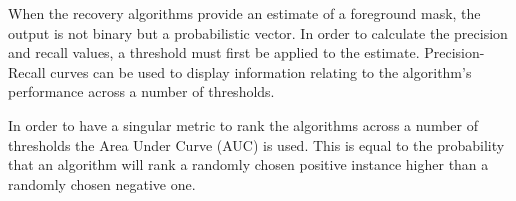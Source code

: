 When the recovery algorithms provide an estimate of a foreground mask, the output is not binary but a probabilistic vector. In order to calculate the precision and recall values, a threshold must first be applied to the estimate. Precision-Recall curves can be used to display information relating to the algorithm's performance across a number of thresholds.

In order to have a singular metric to rank the algorithms across a number of thresholds the Area Under Curve (AUC) \cite{Hanley1983} is used. This is equal to the probability that an algorithm  will rank a randomly chosen positive instance higher than a randomly chosen negative one. 

